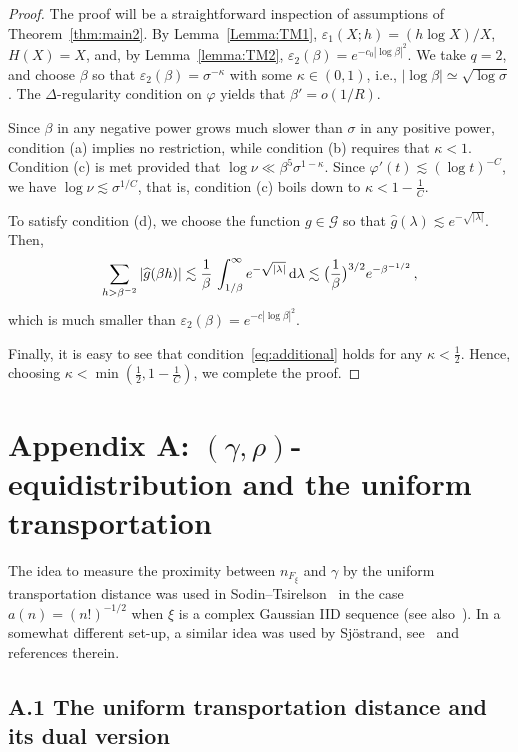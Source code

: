 \documentclass[11pt]{amsart}
\numberwithin{equation}{section}
\def\ep{{\varepsilon}}
\begin{document}
\begin{proof}
The proof will be a straightforward inspection of assumptions of Theorem~\ref{thm:main2}.
By Lemma~\ref{Lemma:TM1}, $\ep_1(X; h) = (h\log X)/X$, $H(X)=X$, and, by Lemma~\ref{lemma:TM2},
$\ep_2(\beta) = e^{-c_0|\log\beta|^2}$. We take $q=2$, and choose $\beta$ so that
$\ep_2(\beta) = \sigma^{-\kappa}$ with some $\kappa\in (0, 1)$,
i.e., $|\log\beta|\simeq \sqrt{\log\sigma}$. The $\Delta$-regularity condition on $\varphi$ yields that $\beta'=o(1/R)$. 

Since $\beta$ in any negative power grows much slower than $\sigma$ in any positive power,
condition (a) implies no restriction, while condition (b) requires that $\kappa<1$.
Condition (c) is met provided that $\log\nu \ll \beta^5 \sigma^{1-\kappa}$.
Since $\varphi'(t)\lesssim (\log t)^{-C}$, we have $\log\nu \lesssim \sigma^{1/C}$, that is,
condition (c) boils down to $\kappa < 1-\tfrac1C$.

To satisfy condition (d), we choose the function $g\in\mathcal G$ so that
$\widehat{g}(\lambda) \lesssim e^{-\sqrt{|\lambda|}}$.
Then,
\[
\sum_{h>\beta^{-2}} |\widehat{g}(\beta h)|
\lesssim \frac1{\beta}\, \int_{1/\beta}^\infty e^{-\sqrt{|\lambda|}}\, {\rm d}\lambda
\lesssim \bigl( \frac1\beta \bigr)^{3/2} e^{-\beta^{-1/2}}\,,
\]
which is much smaller than $\ep_2(\beta)=e^{-c|\log\beta|^2}$.

Finally, it is easy to see that condition~\eqref{eq:additional} holds for any $\kappa<\tfrac12$.
Hence, choosing $\kappa<\min(\tfrac12, 1-\tfrac1C)$, we complete the proof.
\end{proof}

\section*{Appendix A: $(\gamma, \rho)$-equidistribution and the uniform transportation}
\renewcommand{\theequation}{A.\arabic{equation}}
\setcounter{equation}{0}
\renewcommand{\thelemma}{A.\arabic{lemma}}
\setcounter{lemma}{0}

The idea to measure the proximity between $n_{F_\xi}$ and $\gamma$ by
the uniform transportation distance was used in Sodin--Tsirelson~\cite{ST2} in the case
$a(n) = (n!)^{-1/2}$ when $\xi$ is a complex Gaussian IID sequence
(see also~\cite{ST-Transp}). In a somewhat different set-up, a
similar idea was used by Sj\"ostrand, see~\cite[Ch~12]{Sjostrand} and references therein.

\subsection*{A.1 The uniform transportation distance and its dual version}
\end{document}
